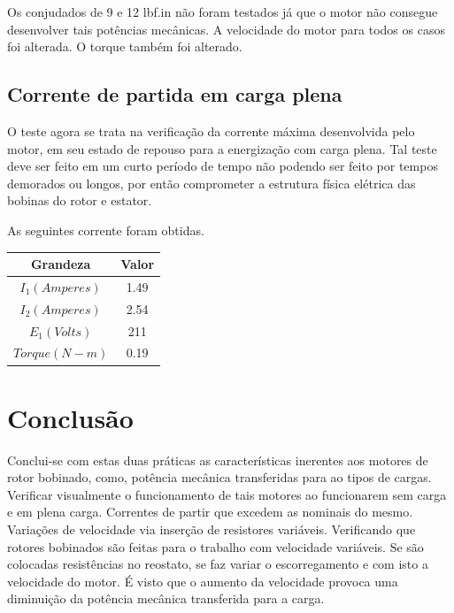 \documentclass[paper=a4, fontsize=11pt]{article}
\begin{document}
Os conjudados de 9 e 12 lbf.in não foram testados já que o motor
não consegue desenvolver tais potências mecânicas. A velocidade 
do motor para todos os casos foi alterada. O torque também foi 
alterado. 

\subsection{Corrente de partida em carga plena}

O teste agora se trata na verificação da corrente máxima
desenvolvida pelo motor, em seu estado de repouso para 
a energização com carga plena. Tal teste deve ser feito
em um curto período de tempo não podendo ser feito por 
tempos demorados ou longos, por então comprometer a estrutura
física elétrica das bobinas do rotor e estator.

As seguintes corrente foram obtidas.

\begin{center}
    \begin{tabular}{c|c}
            Grandeza & Valor  \\
            \hline
            $I_1 (Amperes)$ & 1.49 \\
            $I_2 (Amperes)$ & 2.54  \\
            $E_1 (Volts)$ & 211  \\
            $Torque (N-m)$ & 0.19 \\
    \end{tabular}
\end{center}

\section{Conclusão}

Conclui-se com estas duas práticas as características
inerentes aos motores de rotor bobinado, como, 
potência mecânica transferidas para ao tipos de 
cargas. Verificar visualmente o funcionamento 
de tais motores ao funcionarem sem carga e em
plena carga. Correntes de partir que excedem 
as nominais do mesmo. Variações de velocidade via
inserção de resistores variáveis.
Verificando que rotores bobinados são feitas 
para o trabalho com velocidade variáveis. 
Se são colocadas resistências no reostato, se 
faz variar o escorregamento e com isto a 
velocidade do motor. É visto que o aumento 
da velocidade provoca uma diminuição da 
potência mecânica transferida para a carga.
\end{document}
